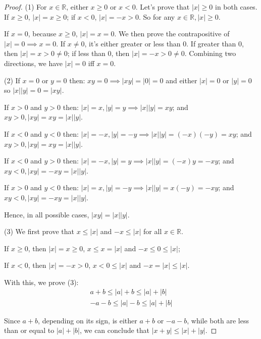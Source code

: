 \documentclass[12pt]{article}
\newcommand{\bbR}{\mathbb{R}}
\theoremstyle{definition}
\numberwithin{equation}{subsection}
\begin{document}
\begin{proof}
(1) For $x \in \bbR$, either $x \geq 0$ or $x < 0$. Let's prove that $|x| \geq 0$ in both cases. If $x \geq 0$, $|x| = x \geq 0$; if $x < 0$, $|x| = -x > 0$. So for any  $x \in \mathbb{R},|x| \geq 0$.

If $x=0$, because $x\geq 0$, $|x|=x =0$. We then prove the contrapositive of $|x|=0\implies x=0$. If $x\neq 0$, it's either greater or less than 0. If greater than 0, then $|x|=x>0\neq 0$; if less than 0, then $|x|=-x>0\neq 0$. Combining two directions, we have $|x|=0$ iff $x=0$.

\bigskip
(2)
If $x=0$ or $y=0$
then:
$
xy=0 \implies |xy|=|0|=0
$
and either $|x|=0$ or $|y|=0$ so
$
|x||y|=0=|xy|
$.

If $x>0$ and $y>0$
then:
$|x| =x, |y| =y \implies |x||y| =x y $;
and
$xy>0, |xy|=xy = |x||y|$.

If $x<0$ and $y<0$
then:
$|x| =-x, |y| =-y \implies |x||y| =(-x)(-y)=xy $;
and
$xy>0, |xy|=xy = |x||y|$.

If $x<0$ and $y>0$
then:
$|x| =-x, |y| =y \implies |x||y| =(-x)y=-xy $;
and
$xy<0, |xy|=-xy = |x||y|$.

If $x>0$ and $y<0$
then:
$|x| =x, |y| =-y \implies |x||y| =x(-y)=-xy $;
and
$xy<0, |xy|=-xy = |x||y|$.

Hence, in all possible cases, $|xy|=|x||y|$.

\bigskip
(3) We first prove that $x\leq|x|$ and $-x\leq|x|$ for all $x\in \bbR$.

If $x\geq 0$, then $|x|=x\geq 0$, $x\leq x=|x|$ and $-x\leq 0 \leq|x|$;

If $x < 0$, then $|x|=-x > 0$, $x < 0 \leq|x|$ and $-x = |x| \leq|x|$.

With this, we prove (3):
$$
\begin{aligned} a+b \leq|a|+b \leq|a|+|b| \\-a-b \leq|a|-b \leq|a|+|b| \end{aligned}
$$

Since $a+b$, depending on its sign, is either $a+b$ or $-a-b$, while both are less than or equal to $|a|+|b|$, we can conclude that $|x+y| \leq|x|+|y|$.
\end{proof}
\end{document}
